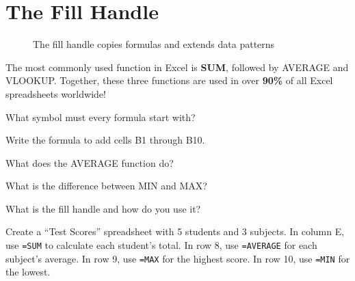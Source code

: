 \section{The Fill Handle}
\label{sec:fill-handle}

\begin{figure}[H]
\centering
{}
\caption{The fill handle copies formulas and extends data patterns}
\label{fig:fill-handle}
\end{figure}



\begin{funfact}
The most commonly used function in Excel is \textbf{SUM}, followed by AVERAGE and VLOOKUP. Together, these three functions are used in over \textbf{90\%} of all Excel spreadsheets worldwide!
\end{funfact}

\begin{reviewqs}
  \item What symbol must every formula start with?
  \item Write the formula to add cells B1 through B10.
  \item What does the AVERAGE function do?
  \item What is the difference between MIN and MAX?
  \item What is the fill handle and how do you use it?
\end{reviewqs}

\begin{challenge}
Create a ``Test Scores'' spreadsheet with 5 students and 3 subjects. In column E, use \texttt{=SUM} to calculate each student's total. In row 8, use \texttt{=AVERAGE} for each subject's average. In row 9, use \texttt{=MAX} for the highest score. In row 10, use \texttt{=MIN} for the lowest.
\end{challenge}

